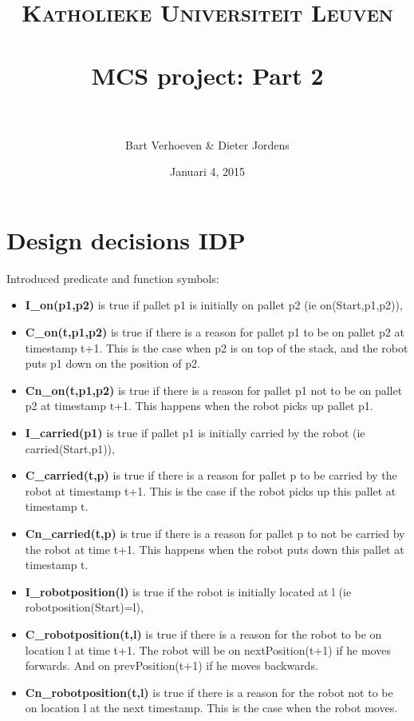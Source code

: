\documentclass[paper=a4, fontsize=11pt]{scrartcl} %
\title{	
\normalfont \normalsize 
\textsc{Katholieke Universiteit Leuven} \\ [25pt] %
\horrule{0.5pt} \\[0.4cm] %
\huge MCS project: Part 2 \\ %
\horrule{2pt} \\[0.5cm] %
}
\author{Bart Verhoeven \& Dieter Jordens} %
\date{\normalsize Januari 4, 2015} %
\numberwithin{equation}{section} %
\numberwithin{figure}{section} %
\numberwithin{table}{section} %
\begin{document}
\maketitle %


\section{Design decisions IDP}

Introduced predicate and function symbols:
\begin{itemize}
	\item \textbf{I\_on(p1,p2)} is true if pallet p1 is initially on pallet p2 (ie on(Start,p1,p2)),
	\item \textbf{C\_on(t,p1,p2)} is true if there is a reason for pallet p1 to be on pallet p2 at timestamp t+1. This is the case when p2 is on top of the stack, and the robot puts p1 down on the position of p2.
	\item \textbf{Cn\_on(t,p1,p2)} is true if there is a reason for pallet p1 not to be on pallet p2 at timestamp t+1. This happens when the robot picks up pallet p1.
	\item \textbf{I\_carried(p1)} is true if pallet p1 is initially carried by the robot (ie carried(Start,p1)),
	\item \textbf{C\_carried(t,p)} is true if there is a reason for pallet p to be carried by the robot at timestamp t+1. This is the case if the robot picks up this pallet at timestamp t.
	\item \textbf{Cn\_carried(t,p)} is true if there is a reason for pallet p to not be carried by the robot at time t+1. This happens when the robot puts down this pallet at timestamp t.
	\item \textbf{I\_robotposition(l)} is true if the robot is initially located at l (ie robotposition(Start)=l),
	\item \textbf{C\_robotposition(t,l)} is true if there is a reason for the robot to be on location l at time t+1. The robot will be on nextPosition(t+1) if he moves forwards. And on prevPosition(t+1) if he moves backwards.
	\item \textbf{Cn\_robotposition(t,l)} is true if there is a reason for the robot not to be on location l at the next timestamp. This is the case when the robot moves.

\end{itemize}
\end{document}
